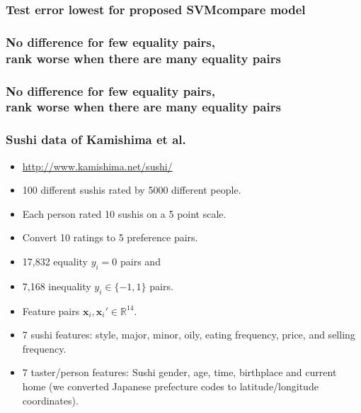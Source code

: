 \documentclass{beamer}
\newcommand{\RR}{\mathbb R}
\begin{document}
\begin{frame}
  \frametitle{Test error lowest for proposed SVMcompare model}
  \begin{minipage}{1.0\linewidth}
    \hskip -0.5cm
      
  \end{minipage}
\end{frame}



\begin{frame}
  \frametitle{No difference for few equality pairs,\\
    rank worse when there are many equality pairs}
  \begin{minipage}{1.0\linewidth}
    \hskip -0.5cm
      
  \end{minipage}
\end{frame}

\begin{frame}
  \frametitle{No difference for few equality pairs,\\
    rank worse when there are many equality pairs}
  \begin{minipage}{1.0\linewidth}
    \hskip -0.5cm
      
  \end{minipage}
\end{frame}

\begin{frame}
  \frametitle{Sushi data of Kamishima et al.}
  \begin{itemize}
  \item  \url{http://www.kamishima.net/sushi/}
  \item 100 different sushis rated by 5000 different people.
  \item Each person rated 10 sushis on a 5 point scale. 
  \item Convert 10 ratings to 5 preference pairs.
  \item 17,832 equality $y_i=0$ pairs and
  \item 7,168 inequality $y_i\in\{-1,1\}$ pairs.
  \item Feature pairs $\mathbf x_i,\mathbf x_i'\in\RR^{14}$.
  \item 7 sushi features: style, major, minor, oily, eating frequency,
    price, and selling frequency.
  \item 7 taster/person features: Sushi gender, age, time, birthplace
    and current home (we converted Japanese prefecture codes to
    latitude/longitude coordinates).
  \end{itemize}
\end{frame}
\end{document}

